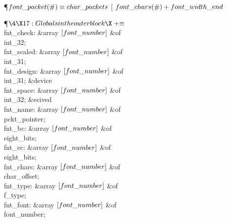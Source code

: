 \P\D $\\{font\_packet}(\#)\S\\{char\_packets}$ [ $\\{font\_chars}(\#)+\\{font%
\_width\_end}$\par
\Y\P$\4\X17:Globals in the outer block\X\mathrel{+}\S$\6
\4\\{fnt\_check}: \&{array} $[\\{font\_number}]$ \1\&{of}\5
\\{int\_32};\2\6
\4\\{fnt\_scaled}: \&{array} $[\\{font\_number}]$ \1\&{of}\5
\\{int\_31};\2\6
\4\\{fnt\_design}: \&{array} $[\\{font\_number}]$ \1\&{of}\5
\\{int\_31};\2\6
\&{device} \\{fnt\_space}: \&{array} $[\\{font\_number}]$ \1\&{of}\5
\\{int\_32};\2\6
\&{ecived}\6
\4\\{fnt\_name}: \&{array} $[\\{font\_number}]$ \1\&{of}\5
\\{pckt\_pointer};\2\6
\4\\{fnt\_bc}: \&{array} $[\\{font\_number}]$ \1\&{of}\5
\\{eight\_bits};\2\6
\4\\{fnt\_ec}: \&{array} $[\\{font\_number}]$ \1\&{of}\5
\\{eight\_bits};\2\6
\4\\{fnt\_chars}: \&{array} $[\\{font\_number}]$ \1\&{of}\5
\\{char\_offset};\2\6
\4\\{fnt\_type}: \&{array} $[\\{font\_number}]$ \1\&{of}\5
\\{f\_type};\2\6
\4\\{fnt\_font}: \&{array} $[\\{font\_number}]$ \1\&{of}\5
\\{font\_number};\2\par
\fi

